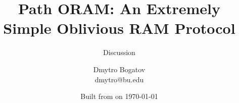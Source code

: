 
\title{Path ORAM: An Extremely Simple Oblivious RAM Protocol} %

\subtitle{Discussion}

\date{Built from \href{https://git.dbogatov.org/bu/PathORAM-Talk/commit/\version}{\emph{\version}} on \today}

\author{Dmytro Bogatov \\ dmytro@bu.edu}


